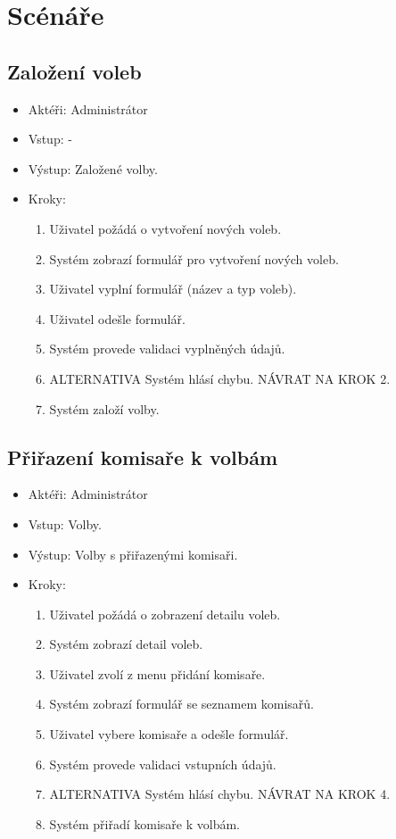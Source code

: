 \documentclass[11pt,twoside,a4paper]{book}
\begin{document}
\section{Scénáře}

\subsection{Založení voleb}

\begin{itemize}
\item Aktéři: Administrátor
\item Vstup: -
\item Výstup: Založené volby.
\item Kroky:
	\begin{enumerate}
		\item Uživatel požádá o vytvoření nových voleb.
		\item Systém zobrazí formulář pro vytvoření nových voleb.
		\item Uživatel vyplní formulář (název a typ voleb).
		\item Uživatel odešle formulář.
		\item Systém provede validaci vyplněných údajů.
		\item ALTERNATIVA Systém hlásí chybu. NÁVRAT NA KROK 2.
		\item Systém založí volby.
	\end{enumerate}
\end{itemize}

\subsection{Přiřazení komisaře k volbám}

\begin{itemize}
\item Aktéři: Administrátor
\item Vstup: Volby. 
\item Výstup: Volby s přiřazenými komisaři.
\item Kroky:
	\begin{enumerate}
		\item Uživatel požádá o zobrazení detailu voleb.
		\item Systém zobrazí detail voleb.
		\item Uživatel zvolí z menu přidání komisaře.
		\item Systém zobrazí formulář se seznamem komisařů.
		\item Uživatel vybere komisaře a odešle formulář.
		\item Systém provede validaci vstupních údajů.
		\item ALTERNATIVA Systém hlásí chybu. NÁVRAT NA KROK 4.
		\item Systém přiřadí komisaře k volbám.
	\end{enumerate}
\end{itemize}
\end{document}
